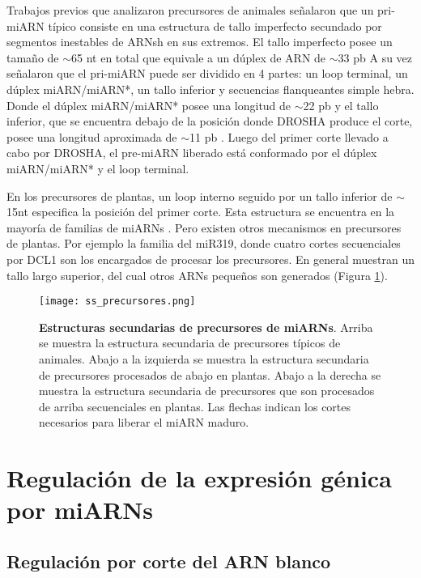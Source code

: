Trabajos previos que analizaron precursores de animales señalaron que un pri-miARN típico consiste en una estructura de tallo imperfecto secundado por segmentos inestables de ARNsh en sus extremos.
El tallo imperfecto posee un tamaño de $\sim$65 nt en total que equivale a un dúplex de ARN de $\sim$33 pb  \citep{pmid16751099}
A su vez señalaron que el pri-miARN puede ser dividido en 4 partes: un loop terminal, un dúplex miARN/miARN*, un tallo inferior y secuencias flanqueantes simple hebra. 
Donde el dúplex miARN/miARN* posee una longitud de $\sim$22 pb y el tallo inferior, que se encuentra debajo de la posición donde DROSHA produce el corte, posee una longitud aproximada de $\sim$11 pb \citep{pmid16751099}.
Luego del primer corte llevado a cabo por DROSHA, el pre-miARN liberado está conformado por el dúplex miARN/miARN* y el loop terminal.

En los precursores de plantas, un loop interno seguido por un tallo inferior de $\sim$15nt especifica la posición del primer corte.
Esta estructura se encuentra en la mayoría de familias de miARNs \citep{Mateos2010,pmid20015653,pmid20015654}.
Pero existen otros mecanismos en precursores de plantas. 
Por ejemplo la familia del miR319, donde cuatro cortes secuenciales por DCL1 son los encargados de procesar los precursores.
En general muestran un tallo largo superior, del cual otros ARNs pequeños son generados \citep{pmid19850910,Bologna2009,Bologna2013} (Figura \ref{fig:ss_precursores}).

\begin{figure}[htbp!] 
	\centering    
	\texttt{[image: ss\_precursores.png]}
	\caption[Estructuras  de precursores de miARNs]{
		\textbf{Estructuras secundarias de precursores de miARNs}.
        Arriba se muestra la estructura secundaria de precursores típicos de animales.
        Abajo a la izquierda se muestra la estructura secundaria de precursores procesados de abajo en plantas.
        Abajo a la derecha se muestra la estructura secundaria de precursores que son procesados de arriba secuenciales en plantas.
        Las flechas indican los cortes necesarios para liberar el miARN maduro.
    }
	\label{fig:ss_precursores}
\end{figure}

\section{Regulación de la expresión génica por miARNs}

\subsection{Regulación por corte del ARN blanco}

